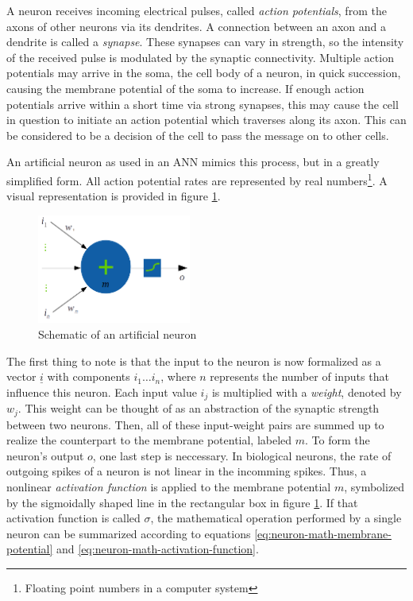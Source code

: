 \documentclass[11pt, a4paper]{article}
\renewcommand{\vec}[1]{\underline{#1}}
\begin{document}
A neuron receives incoming electrical pulses, called \emph{action potentials}, from the axons of other neurons via its dendrites. A connection between an axon and a dendrite is called a \emph{synapse}. These synapses can vary in strength, so the intensity of the received pulse is modulated by the synaptic connectivity. Multiple action potentials may arrive in the soma, the cell body of a neuron, in quick succession, causing the membrane potential of the soma to increase. If enough action potentials arrive within a short time via strong synapses, this may cause the cell in question to initiate an action potential which traverses along its axon. This can be considered to be a decision of the cell to pass the message on to other cells.

An artificial neuron as used in an ANN mimics this process, but in a greatly simplified form. All action potential rates are represented by real numbers\footnote{Floating point numbers in a computer system}. A visual representation is provided in figure \ref{fig:artificial-neuron-schematic}.


\begin{figure}[htb]
	\centering
	\includegraphics[width=0.45\textwidth]{images/artificial_neuron.png}
	\caption{Schematic of an artificial neuron}
	\label{fig:artificial-neuron-schematic}
\end{figure}

The first thing to note is that the input to the neuron is now formalized as a vector $\vec{i}$ with components $i_1 \dots i_n$, where $n$ represents the number of inputs that influence this neuron. Each input value $i_j$ is multiplied with a \emph{weight}, denoted by $w_j$. This weight can be thought of as an abstraction of the synaptic strength between two neurons. Then, all of these input-weight pairs are summed up to realize the counterpart to the membrane potential, labeled $m$. To form the neuron's output $o$, one last step is neccessary. In biological neurons, the rate of outgoing spikes of a neuron is not linear in the incomming spikes. Thus, a nonlinear \emph{activation function} is applied to the membrane potential $m$, symbolized by the sigmoidally shaped line in the rectangular box in figure \ref{fig:artificial-neuron-schematic}. If that activation function is called $\sigma$, the mathematical operation performed by a single neuron can be summarized according to equations \eqref{eq:neuron-math-membrane-potential} and \eqref{eq:neuron-math-activation-function}.
\end{document}
